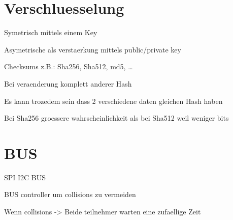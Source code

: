 
\section{Verschluesselung}

Symetrisch mittels einem Key

Asymetrische als verstaerkung mittels public/private key

Checksums z.B.: Sha256, Sha512, md5, \ldots

Bei veraenderung komplett anderer Hash

Es kann trozedem sein dass 2 verschiedene daten gleichen Hash haben

Bei Sha256 groessere wahrscheinlichkeit als bei Sha512 weil weniger bits

\section{BUS}

SPI I2C BUS 

BUS controller um collisions zu vermeiden

Wenn collisions -> Beide teilnehmer warten eine zufaellige Zeit


